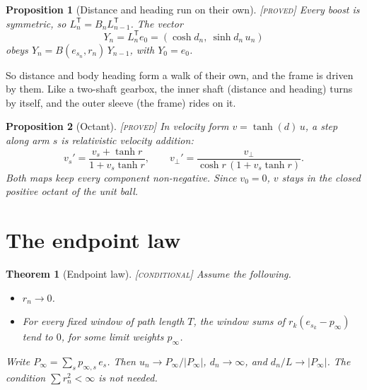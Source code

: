 \documentclass[11pt]{article}
\newtheorem{theorem}{Theorem}
\newtheorem{proposition}{Proposition}
\theoremstyle{definition}
\theoremstyle{remark}
\newcommand{\grade}[1]{\textsc{[#1]}}
\begin{document}
\begin{proposition}[Distance and heading run on their own] \grade{proved}
Every boost is symmetric, so $L_n^{\mathsf T}=B_nL_{n-1}^{\mathsf T}$. The vector
\[
Y_n=L_n^{\mathsf T}e_0=(\cosh d_n,\ \sinh d_n\,u_n)
\]
obeys $Y_n=B(e_{s_n},r_n)\,Y_{n-1}$, with $Y_0=e_0$.
\end{proposition}

\noindent So distance and body heading form a walk of their own, and the frame is driven by them. Like a two-shaft gearbox, the inner shaft (distance and heading) turns by itself, and the outer sleeve (the frame) rides on it.

\begin{proposition}[Octant] \grade{proved}
In velocity form $v=\tanh(d)\,u$, a step along arm $s$ is relativistic velocity addition:
\[
v_s'=\frac{v_s+\tanh r}{1+v_s\tanh r},\qquad v_\perp'=\frac{v_\perp}{\cosh r\,(1+v_s\tanh r)}.
\]
Both maps keep every component non-negative. Since $v_0=0$, $v$ stays in the closed positive octant of the unit ball.
\end{proposition}

\section{The endpoint law}

\begin{theorem}[Endpoint law] \grade{conditional}
Assume the following.
\begin{itemize}
\item[(A1)] $r_n\to0$.
\item[(A2)] For every fixed window of path length $T$, the window sums of $r_k(e_{s_k}-p_\infty)$ tend to $0$, for some limit weights $p_\infty$.
\end{itemize}
Write $P_\infty=\sum_s p_{\infty,s}\,e_s$. Then $u_n\to P_\infty/|P_\infty|$, $d_n\to\infty$, and $d_n/L\to|P_\infty|$. The condition $\sum r_n^2<\infty$ is not needed.
\end{theorem}
\end{document}
